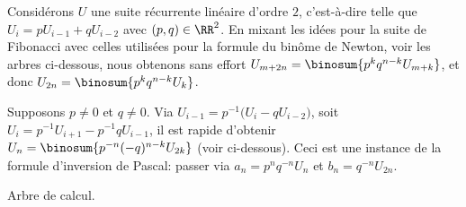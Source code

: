 

\begin{remark}
	Considérons $U$ une suite récurrente linéaire d'ordre $2$,
	c'est-à-dire telle que
	$U_{i} = p U_{i-1} + q U_{i-2}$ avec $(p, q) \in \RR^2$.
	En mixant les idées pour la suite de Fibonacci avec celles utilisées pour la formule du binôme de Newton, voir les arbres ci-dessous, nous obtenons sans effort
	$U_{m+2n} = \binosum{p^k q^{n-k} U_{m+k}}$,
	et donc
	$U_{2n} = \binosum{p^k q^{n-k} U_{k}}$.

    	        {\intertree}{}
	        
	
	Supposons $p \neq 0$ et $q \neq 0$.
	Via  $U_{i-1} = p^{-1} \big( U_{i} - q U_{i-2} \big)$, 
	soit $U_{i} = p^{-1} U_{i+1} - p^{-1} q U_{i-1}$,
	il est rapide d'obtenir
	$U_n = \binosum{p^{-n} (-q)^{n-k} U_{2k}}$ (voir ci-dessous).
	Ceci est une instance de la formule d'inversion de Pascal:
    passer via
    $a_n = p^n q^{-n} U_{n}$
    et
    $b_n = q^{-n} U_{2n}$.

    \begin{center}
    	\itshape\centering
        
    
        Arbre de calcul.
    \end{center}
\end{remark}
